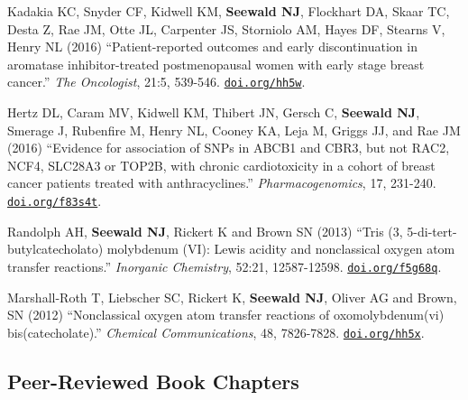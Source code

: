 \documentclass[letterpaper,11pt]{article} %
\begin{document}
\begin{etaremune}
		\item Kadakia KC, Snyder CF, Kidwell KM, \textbf{Seewald NJ}, Flockhart DA, Skaar TC, Desta Z, Rae JM, Otte JL, Carpenter JS, Storniolo AM, Hayes DF, Stearns V, Henry NL (2016) ``Patient-reported outcomes and early discontinuation in aromatase inhibitor-treated postmenopausal women with early stage breast cancer.'' \textit{The Oncologist}, 21:5, 539-546. \href{https://doi.org/hh5w}{\texttt{doi.org/hh5w}}.
			
		\item Hertz DL, Caram MV, Kidwell KM, Thibert JN, Gersch C, \textbf{Seewald NJ}, Smerage J, Rubenfire M, Henry NL, Cooney KA, Leja M, Griggs JJ, and Rae JM (2016) ``Evidence for association of SNPs in ABCB1 and CBR3, but not RAC2, NCF4, SLC28A3 or TOP2B, with chronic cardiotoxicity in a cohort of breast cancer patients treated with anthracyclines.'' \textit{Pharmacogenomics}, 17, 231-240. \href{https://doi.org/f83s4t}{\texttt{doi.org/f83s4t}}.
			
		\item Randolph AH, \textbf{Seewald NJ}, Rickert K and Brown SN (2013) ``Tris (3, 5-di-tert-butylcate\-cholato) molybdenum (VI): Lewis acidity and nonclassical oxygen atom transfer reactions.'' \textit{Inorganic Chemistry}, 52:21, 12587-12598. \href{https://doi.org/f5g68q}{\texttt{doi.org/f5g68q}}.

		\item Marshall-Roth T, Liebscher SC, Rickert K, \textbf{Seewald NJ}, Oliver AG and Brown, SN (2012) ``Nonclassical oxygen atom transfer reactions of oxomolybdenum(vi) bis(catecholate).'' \textit{Chemical Communications}, 48, 7826-7828. \href{https://doi.org/hh5x}{\texttt{doi.org/hh5x}}.
	\end{etaremune}

	
	\subsection*{Peer-Reviewed Book Chapters}
	
\end{document}
